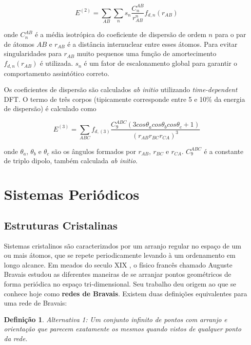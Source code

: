 			\begin{equation}
				E^{(2)} = \sum_{AB}\sum_n s_n \frac{C_n^{AB}}{r^n_{AB}}f_{d,n}(r_{AB}) 
			\end{equation}
			
			onde $C^{AB}_n$ é a média isotrópica do coeficiente de dispersão de ordem $n$ para o par de átomos $AB$ e $r_{AB}$ é a distância internuclear entre esses átomos. Para evitar singularidades para $r_{AB}$ muito pequenos uma função de amortecimento $f_{d,n}(r_{AB})$ é utilizada. $s_n$ é um fator de escalonamento global para garantir o comportamento assintótico correto.
			
			Os coeficientes de dispersão são calculados \textit{ab initio} utilizando \textit{time-dependent} DFT. O termo de três corpos (tipicamente corresponde entre 5 e 10\% da energia de dispersão) é calculado como
			
			\begin{equation}
				E^{(3)} = \sum_{ABC} f_{d,(3)} \frac{C_9^{ABC}(3 cos\theta_a cos\theta_b cos\theta_c + 1)}{(r_{AB}r_{BC}r_{CA})^3}
			\end{equation}
			
			onde $\theta_a$, $\theta_b$ e $\theta_c$ são os ângulos formados por $r_{AB}$, $r_{BC}$ e $r_{CA}$. $C_9^{ABC}$ é a constante de triplo dipolo, também calculada \textit{ab initio}. 
			
\section{Sistemas Periódicos}

	\subsection{Estruturas Cristalinas}
	
		Sistemas cristalinos são caracterizados por um arranjo regular no espaço de um ou mais átomos, que se repete periodicamente levando à um ordenamento em longo alcance. Em meados do seculo XIX , o físico francês chamado Auguste Bravais estudou as diferentes maneiras de se arranjar pontos geométricos de forma periódica no espaço tri-dimensional. Seu trabalho deu origem ao que se conhece hoje como \textbf{redes de Bravais}. Existem duas definições equivalentes para uma rede de Bravais:
		\newtheorem{def1}{Defini\c{c}\~ao}
		\begin{def1}{Alternativa 1:}
			\label{defi4.1}
			Um conjunto infinito de pontos com arranjo e orientação que parecem exatamente os mesmos quando vistos de qualquer ponto da rede.
		\end{def1}
		
